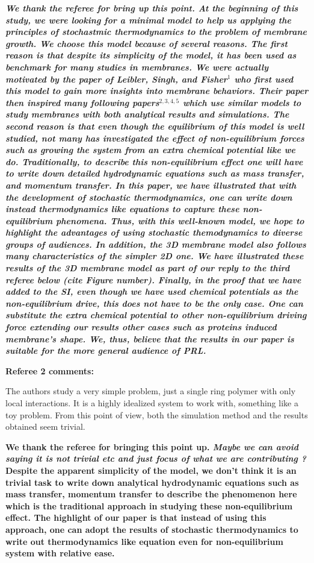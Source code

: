 \documentclass{letter}
\begin{document}
\begin{letter}{}
\textit{ \bf We thank the referee for bring up this point. At the beginning of this study, we were looking for a minimal model to help us applying the principles of stochastmic thermodynamics to the problem of membrane growth. We choose this model because of several reasons. The first reason is that despite its simplicity of the model, it has been used as benchmark for many studies in membranes. We were actually motivated by the paper of Leibler, Singh, and Fisher$^1$ who first used this model to gain more insights into membrane behaviors. Their paper then inspired many following papers$^{2,3,4,5}$  which use similar models to study membranes with both analytical results and simulations. The second reason is that even though the equilibrium of this model is well studied, not many has investigated the effect of non-equilibrium forces such as growing the system from an extra chemical potential like we do. Traditionally, to describe this non-equilibrium effect one will have to write down detailed hydrodynamic equations such as mass transfer, and momentum transfer. In this paper, we have illustrated that with the development of stochastic thermodynamics, one can write down instead thermodynamics like equations to capture these non-equilibrium phenomena. Thus, with this well-known model, we hope to highlight the advantages of using stochastic themodynamics to diverse groups of audiences. In addition, the 3D membrane model also follows many characteristics of the simpler 2D one. We have illustrated these results of the 3D membrane model as part of our reply to the third referee below ({\bf \it cite Figure number}). Finally, in the proof that we have added to the SI, even though we have used chemical potentials as the non-equilibrium drive, this does not have to be the only case. One can substitute the extra chemical potential to other non-equilibrium driving force extending our results other cases such as proteins induced membrane’s shape. We, thus, believe that the results in our paper is suitable for the more general audience of PRL.} 


{\bf Referee 2 comments:}

  The authors study a very simple problem, just a single ring polymer 
with only local interactions. It is a highly idealized system to work 
with, something like a toy problem. From this point of view, both the 
simulation method and the results obtained seem trivial. 

{\bf We thank the referee for bringing this point up. {\it Maybe we can avoid saying it is not trivial etc and just focus of what we are contributing ? }Despite the apparent simplicity of the model, we don't think it is an trivial task to write down analytical hydrodynamic equations such as mass transfer, momentum transfer to describe the phenomenon here which is the traditional approach in studying these non-equilibrium effect. The highlight of our paper is that instead of using this approach, one can adopt the results of stochastic thermodynamics to write out thermodynamics like equation even for non-equilibrium system with relative ease. }


\end{letter}
\end{document}
